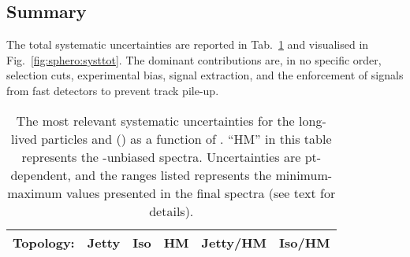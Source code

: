 \subsection{Summary}

The total systematic uncertainties are reported in Tab.~\ref{tab:sphero:syst} and visualised in Fig.~\ref{fig:sphero:systtot}. The dominant contributions are, in no specific order, selection cuts, experimental bias, signal extraction, and the enforcement of signals from fast detectors to prevent track pile-up.

\begin{table}[H]
\centering
\caption{The most relevant systematic uncertainties for the long-lived particles \KOs and \LA(\AL) as a function of \SOPT. ``HM'' in this table represents the \SOPT-unbiased spectra. Uncertainties are pt-dependent, and the ranges listed represents the minimum-maximum values presented in the final spectra (see text for details). }
\label{tab:sphero:syst}
\begin{tabular}{|l|lllll|}
\hline
\multicolumn{1}{|r|}{Topology:}              & Jetty     & Iso       & HM        & Jetty/HM       & Iso/HM      \\ \hline


\end{tabular}
\end{table}
